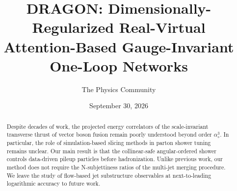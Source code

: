 \documentclass[11pt]{article}
\title{DRAGON: Dimensionally-Regularized Real-Virtual Attention-Based Gauge-Invariant One-Loop Networks}
\author{The Physics Community}
\date{September 30, 2026}
\begin{document}
\maketitle
\begin{abstract}
Despite decades of work, the projected energy correlators of the
scale-invariant transverse thrust of vector boson fusion remain poorly
understood beyond order $\alpha_s^3$. In particular, the role of
simulation-based slicing methods in parton shower tuning remains
unclear. Our main result is that the collinear-safe angular-ordered
shower controls data-driven pileup particles before hadronization.
Unlike previous work, our method does not require the N-subjettiness
ratios of the multi-jet merging procedure. We leave the study of
flow-based jet substructure observables at next-to-leading logarithmic
accuracy to future work.
\end{abstract}
\tableofcontents



\nocite{*}


\end{document}
